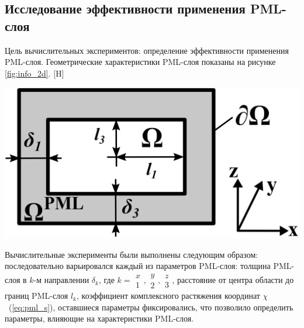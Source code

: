 \documentclass[a4paper,14pt]{article}
\makeatletter
\renewenvironment{figure}[1][\fps@figure]{
  \edef\@tempa{\noexpand\@float{figure}[#1]}
  \@tempa
  \addtocounter{foofigure}{1}
}{
  \end@float
}
\makeatother
\begin{document}
\subsection{Исследование эффективности применения PML-слоя}
Цель вычислительных экспериментов: определение эффективности применения PML-слоя.
Геометрические характеристики PML-слоя показаны на рисунке \ref{fig:info_2d}.
\begin{figure}[H]
	\centering
	\includegraphics[scale=1.25]{research-2/info_2d_2.png}
	\caption{геометрические характеристики PML-слоя}
	\label{fig:info_2d}
\end{figure}

Вычислительные эксперименты были выполнены следующим образом: последовательно варьировался каждый из параметров PML-слоя: толщина PML-слоя в $k$-м направлении $\delta_k$, где $k = \begin{smallmatrix}x\\1\end{smallmatrix},\begin{smallmatrix}y\\2\end{smallmatrix},\begin{smallmatrix}z\\3\end{smallmatrix}$, расстояние от центра области до границ PML-слоя $l_k$, коэффициент комплексного растяжения координат $\chi$~(\ref{eq:pml_s}), оставшиеся параметры фиксировались, что позволило определить параметры, влияющие на характеристики PML-слоя.
\end{document}
